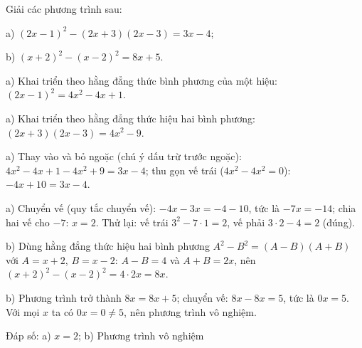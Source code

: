 \begin{problem}[8DS-PT1-043]
Giải các phương trình sau:

a) $(2x - 1)^2 - (2x + 3)(2x - 3) = 3x - 4$;

b) $(x + 2)^2 - (x - 2)^2 = 8x + 5$.

\begin{solution}
a) Khai triển theo hằng đẳng thức bình phương của một hiệu: $(2x - 1)^2 = 4x^2 - 4x + 1$.

a) Khai triển theo hằng đẳng thức hiệu hai bình phương: $(2x + 3)(2x - 3) = 4x^2 - 9$.

a) Thay vào và bỏ ngoặc (chú ý dấu trừ trước ngoặc): $4x^2 - 4x + 1 - 4x^2 + 9 = 3x - 4$; thu gọn vế trái ($4x^2 - 4x^2 = 0$): $-4x + 10 = 3x - 4$.

a) Chuyển vế (quy tắc chuyển vế): $-4x - 3x = -4 - 10$, tức là $-7x = -14$; chia hai vế cho $-7$: $x = 2$. Thử lại: vế trái $3^2 - 7 \cdot 1 = 2$, vế phải $3 \cdot 2 - 4 = 2$ (đúng).

b) Dùng hằng đẳng thức hiệu hai bình phương $A^2 - B^2 = (A - B)(A + B)$ với $A = x + 2$, $B = x - 2$: $A - B = 4$ và $A + B = 2x$, nên $(x + 2)^2 - (x - 2)^2 = 4 \cdot 2x = 8x$.

b) Phương trình trở thành $8x = 8x + 5$; chuyển vế: $8x - 8x = 5$, tức là $0x = 5$. Với mọi $x$ ta có $0x = 0 \neq 5$, nên phương trình vô nghiệm.

Đáp số: a) $\boxed{x = 2}$; b) $\boxed{\text{Phương trình vô nghiệm}}$
\end{solution}
\end{problem}

